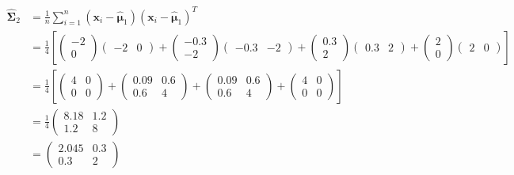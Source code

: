 \documentclass{homeworg}
\begin{document}
\begin{equation}
    \begin{aligned}
        \bm{\hat{\Sigma}}_2 &= \frac{1}{n}\sum_{i=1}^n(\bm{x}_i - \bm{\hat{\mu}}_1)(\bm{x}_i - \bm{\hat{\mu}}_1)^T
        \\
        &=\frac{1}{4}\left[
            \begin{pmatrix}-2\\0\end{pmatrix}\begin{pmatrix} -2&0 \end{pmatrix} +
            \begin{pmatrix}-0.3\\-2\end{pmatrix}\begin{pmatrix} -0.3&-2 \end{pmatrix} +
            \begin{pmatrix}0.3\\2\end{pmatrix}\begin{pmatrix} 0.3&2 \end{pmatrix} +
            \begin{pmatrix}2\\0\end{pmatrix}\begin{pmatrix} 2&0 \end{pmatrix}
        \right]
        \\
        &=\frac{1}{4}\left[
            \begin{pmatrix}4&0\\0&0\end{pmatrix} + 
            \begin{pmatrix}0.09&0.6\\0.6&4\end{pmatrix} + 
            \begin{pmatrix}0.09&0.6\\0.6&4\end{pmatrix} + 
            \begin{pmatrix}4&0\\0&0\end{pmatrix}
        \right]
        \\
        &=\frac{1}{4}\begin{pmatrix}8.18&1.2\\1.2&8\end{pmatrix}
        \\
        &=\begin{pmatrix}2.045&0.3\\0.3&2\end{pmatrix}
    \end{aligned}
\end{equation}
\end{document}
